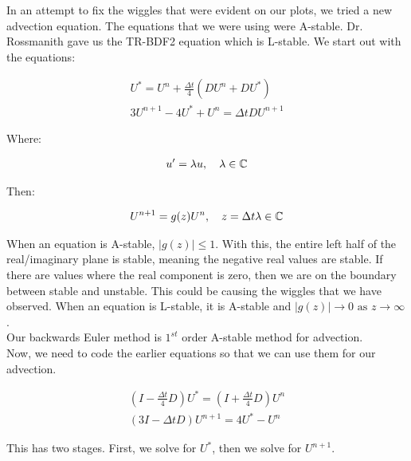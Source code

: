 

In an attempt to fix the wiggles that were evident on our plots, we tried a new advection equation. The equations that we were using were A-stable. Dr. Rossmanith gave us the TR-BDF2 equation which is L-stable. We start out with the equations:

\begin{align*}
U^* = U^n + \frac{\Delta t}{4}(DU^n + DU^*) \\
3U^{n+1} - 4U^* + U^n = \Delta t DU^{n+1}
\end{align*}

Where:

\begin{align*}
u' = \lambda u , \quad \lambda \in \mathbb{C}
\end{align*}

Then:

\begin{align*}
U^{n+1} = g(z)U^n, \quad z = \Delta t \lambda \in \mathbb{C}
\end{align*}

When an equation is A-stable, $|g(z)| \leq 1$. With this, the entire left half of the real/imaginary plane is stable, meaning the negative real values are stable. If there are values where the real component is zero, then we are on the boundary between stable and unstable. This could be causing the wiggles that we have observed. When an equation is L-stable, it is A-stable and $|g(z)| \to 0 \text{ as } z \to \infty$. \\

Our backwards Euler method is $1^{st}$ order A-stable method for advection. \\

Now, we need to code the earlier equations so that we can use them for our advection.

\begin{align*}
\left(I - \frac{\Delta t}{4}D\right)U^* = \left(I + \frac{\Delta t}{4}D\right)U^n \\
(3I - \Delta t D)U^{n+1} = 4U^* - U^n
\end{align*}

This has two stages. First, we solve for $U^*$, then we solve for $U^{n+1}$.